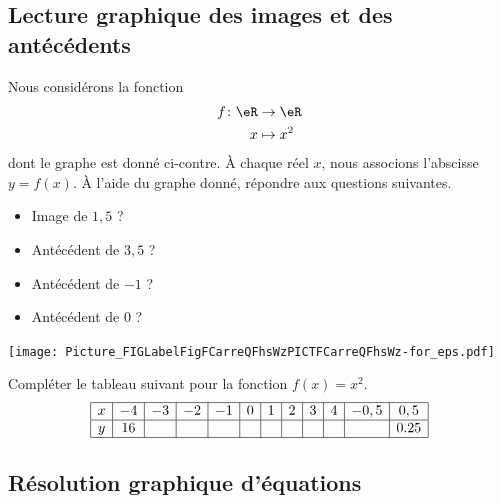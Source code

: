 \subsection{Lecture graphique des images et des antécédents}

\begin{multicols}{2}

    Nous considérons la fonction
    \begin{equation}
        \begin{aligned}
            f\colon \eR&\to \eR \\
            x&\mapsto x^2 
        \end{aligned}
    \end{equation}
    dont le graphe est donné ci-contre. À chaque réel $x$, nous associons l'abscisse $y=f(x)$.  À l'aide du graphe donné, répondre aux questions suivantes.

    \begin{itemize}
        \item Image de $1,5$ ? 
        \item Antécédent de $3,5$ ?  
        \item Antécédent de $-1$ ? 
        \item Antécédent de $0$ ? 
    \end{itemize}

    \columnbreak

    \texttt{[image: Picture\_FIGLabelFigFCarreQFhsWzPICTFCarreQFhsWz-for\_eps.pdf]}

\end{multicols}

  \begin{example}
Compléter le tableau suivant pour la fonction $f(x)=x^2$.
\begin{equation}
\begin{array}[h]{|c|c|c|c|c|c|c|c|c|c|c|c|}
  \hline  
  x & -4 & -3 & -2 & -1 & 0 & 1 & 2 & 3 & 4 & -0,5 & 0,5  \\
  \hline
  y & 16 &&&&&&&&&&0.25\\
  \hline
\end{array}
\end{equation}
  \end{example}


\subsection{Résolution graphique d'équations}

